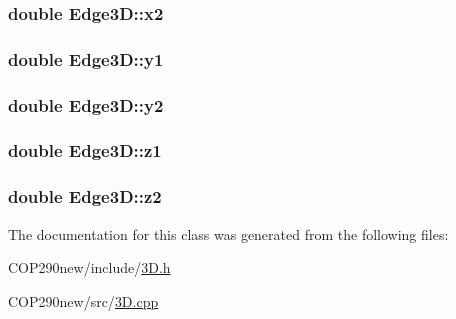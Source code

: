 \subsubsection[{\texorpdfstring{x2}{x2}}]{\setlength{\rightskip}{0pt plus 5cm}double Edge3\+D\+::x2}\hypertarget{class_edge3_d_aec211f03fd993aed5d510dfcab36aca2}{}\label{class_edge3_d_aec211f03fd993aed5d510dfcab36aca2}
\subsubsection[{\texorpdfstring{y1}{y1}}]{\setlength{\rightskip}{0pt plus 5cm}double Edge3\+D\+::y1}\hypertarget{class_edge3_d_ae106a8276a2ff4ded94a6bde8eece33b}{}\label{class_edge3_d_ae106a8276a2ff4ded94a6bde8eece33b}
\subsubsection[{\texorpdfstring{y2}{y2}}]{\setlength{\rightskip}{0pt plus 5cm}double Edge3\+D\+::y2}\hypertarget{class_edge3_d_a7ef8a92f2478c20eafb32f1063987d64}{}\label{class_edge3_d_a7ef8a92f2478c20eafb32f1063987d64}
\subsubsection[{\texorpdfstring{z1}{z1}}]{\setlength{\rightskip}{0pt plus 5cm}double Edge3\+D\+::z1}\hypertarget{class_edge3_d_a87106a57b9e20b46cec47f62a510e86c}{}\label{class_edge3_d_a87106a57b9e20b46cec47f62a510e86c}
\subsubsection[{\texorpdfstring{z2}{z2}}]{\setlength{\rightskip}{0pt plus 5cm}double Edge3\+D\+::z2}\hypertarget{class_edge3_d_ac5993c7d892a67d35e43d9ca02320a78}{}\label{class_edge3_d_ac5993c7d892a67d35e43d9ca02320a78}


The documentation for this class was generated from the following files\+:\begin{DoxyCompactItemize}
\item 
C\+O\+P290new/include/\hyperlink{3_d_8h}{3\+D.\+h}\item 
C\+O\+P290new/src/\hyperlink{3_d_8cpp}{3\+D.\+cpp}\end{DoxyCompactItemize}
